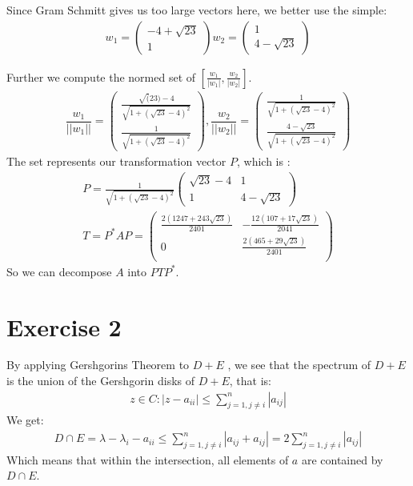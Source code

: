 Since Gram Schmitt gives us too large vectors here, we better use the simple:
\begin{gather*}
w_1 = \left( \begin{array}{c}
-4+\sqrt{23}  \\
1
\end{array} \right)
w_2 = \left( \begin{array}{c}
1  \\
4 - \sqrt{23}
\end{array} \right)
\end{gather*}


Further we compute the normed set of $\left[ \frac{w_1}{|w_1|}, \frac{w_2}{|w_2|} \right]$.
\begin{gather*}
\dfrac{w_1}{||w_1||} = \left( \begin{array}{c}
\frac{\sqrt(23) - 4}{\sqrt{1 + \left( \sqrt{23} -4 \right)^2}} \\
\frac{1}{\sqrt{1 + \left( \sqrt{23} -4 \right)^2}}
\end{array} \right)
, \dfrac{w_2}{||w_2||} = \left( \begin{array}{c}
\frac{1}{\sqrt{1 + \left( \sqrt{23} -4 \right)^2}}\\
\frac{4-\sqrt{23}}{\sqrt{1 + \left( \sqrt{23} -4 \right)^2}}
\end{array} \right)
\end{gather*}
The set represents our transformation vector $P$, which is :
\begin{gather*}
P = \frac{1}{\sqrt{1 + \left( \sqrt{23} -4 \right)^2}}\left( \begin{array}{cc}
\sqrt{23} -4 & 1\\
1 & 4-\sqrt{23}
\end{array} \right) \\
T = P^{*} A P =  \left( \begin{array}{cc}
\frac{2 \left( 1247+243 \sqrt{23} \right)}{2401}  & -\frac{12 \left( 107+17 \sqrt{23} \right)}{2041} \\
0 & \frac{2 \left( 465+29\sqrt{23} \right) }{2401} \\
\end{array} \right)
\end{gather*}
So we can decompose $A$ into $PTP^{*}$.


\section{Exercise 2}
By applying Gershgorins Theorem to $D + E$ , we see that the spectrum of $D+E$ is the union of the Gershgorin disks of $D+E$, that is:
\begin{gather*}
z \in C : | z - a_{ii} | \leq \sum\limits_{j=1 ,j \neq i}^n |a_{ij}|
\end{gather*}
We get:
\begin{gather*}
D \cap E = \lambda - \lambda_i - a_{ii} \leq \sum\limits_{j=1 ,j \neq i}^n |a_{ij} + a_{ij}| = 
2 \sum\limits_{j=1 ,j \neq i}^n | a_{ij}| 
\end{gather*}
Which means that within the intersection, all elements of $a$ are contained by $D \cap E$.
